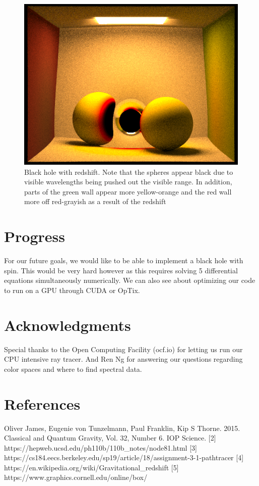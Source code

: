 \documentclass[sigconf]{acmart}
\begin{document}
\begin{figure}[h]
  \centering
  \includegraphics[width=\linewidth]{CBspheres_lambertian_screenshot_4-28_20-52-32.png}
  \caption{Black hole with redshift.  Note that the spheres appear black due to visible wavelengths being pushed out the visible range.  In addition, parts of the green wall appear more yellow-orange and the red wall more off red-grayish as a result of the redshift}
  \Description{}
\end{figure}

\section{Progress}

For our future goals, we would like to be able to implement a black hole with spin.  This would be very hard however as this requires solving 5 differential equations simultaneously numerically.  We can also see about optimizing our code to run on a GPU through CUDA or OpTix.

\section{Acknowledgments}

Special thanks to the Open Computing Facility (ocf.io) for letting us run our CPU intensive ray tracer. And Ren Ng for answering our questions regarding color spaces and where to find spectral data.

\section{References}
\begin{text}
[1] Oliver James, Eugenie von Tunzelmann, Paul Franklin, Kip S Thorne. 2015.  Classical and Quantum Gravity, Vol. 32, Number 6. IOP Science.
[2] https://hepweb.ucsd.edu/ph110b/110b_notes/node81.html
[3] https://cs184.eecs.berkeley.edu/sp19/article/18/assignment-3-1-pathtracer
[4] https://en.wikipedia.org/wiki/Gravitational_redshift 
[5] https://www.graphics.cornell.edu/online/box/
\end{text}
\end{document}
